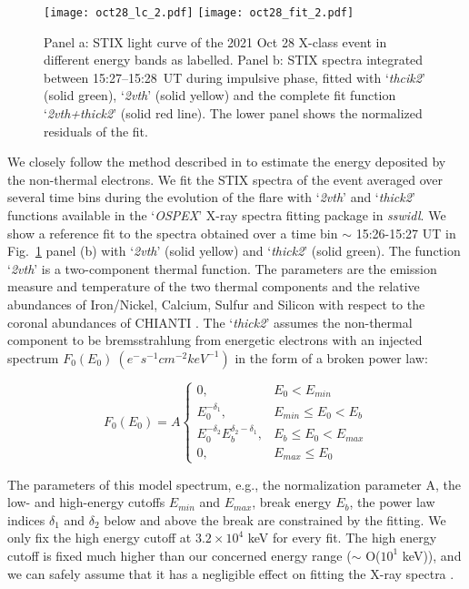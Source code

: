 \begin{figure}[ht!]
    \centering
    \texttt{[image: oct28\_lc\_2.pdf]} 
    \texttt{[image: oct28\_fit\_2.pdf]}
    \caption{Panel a: STIX light curve of the 2021 Oct 28 X-class event in different energy bands as labelled. Panel b: STIX spectra integrated between 15:27{--}15:28~UT during impulsive phase, fitted with `\textit{thcik2}' (solid green), `\textit{2vth}' (solid yellow) and the complete fit function `\textit{2vth+thick2}' (solid red line). The lower panel shows the normalized residuals of the fit.}
    \label{fig:stix_an}
    \end{figure}

We closely follow the method described in \cite{emslie12} to estimate the energy deposited by the non-thermal electrons. We fit the STIX spectra of the event averaged over several time bins during the evolution of the flare with `\textit{2vth}' and `\textit{thick2}' functions available in the `\textit{OSPEX}' X-ray spectra fitting package in {\it sswidl}. We show a reference fit to the spectra obtained over a time bin $\sim$ 15:26-15:27 UT in Fig.~\ref{fig:stix_an} panel (b) with `\textit{2vth}' (solid yellow) and `\textit{thick2}' (solid green). The function `\textit{2vth}' is a two-component thermal function. The parameters are the emission measure and temperature of the two thermal components and the relative abundances of Iron/Nickel, Calcium, Sulfur and Silicon with respect to the coronal abundances of CHIANTI \citep{chianti1,chianti}. The `\textit{thick2}' assumes the non-thermal component to be bremsstrahlung from energetic electrons with an injected spectrum $F_{0}(E_{0})~(e^{-}s^{-1}cm^{-2}keV^{-1})$ in the form of a broken power law:

\begin{equation}
    F_{0}(E_{0})=A
    \begin{cases}
        0, & E_{0}<E_{min} \\
        E_{0}^{-\delta_{1}}, & E_{min} \le E_{0} < E_{b} \\
        E_{0}^{-\delta_{2}}E_{b}^{\delta_{2}-\delta_{1}}, & E_{b} \le E_{0} < E_{max} \\
        0, & E_{max} \le E_{0}
    \end{cases}
\end{equation}

The parameters of this model spectrum, e.g., the normalization parameter A, the low- and high-energy cutoffs $E_{min}$ and $E_{max}$, break energy $E_{b}$, the power law indices $\delta_{1}$ and $\delta_{2}$ below and above the break are constrained by the fitting. We only fix the high energy cutoff at $3.2\times 10^{4}$ keV for every fit. The high energy cutoff is fixed much higher than our concerned energy range ($\sim$ O($10^{1}$ keV)), and we can safely assume that it has a negligible effect on fitting the X-ray spectra \citep{emslie12}. 

